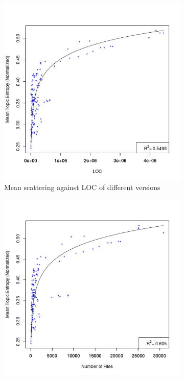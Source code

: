 \documentclass[12pt]{article}
\begin{document}

\begin{figure}
        \centering
        \begin{subfigure}[b]{0.5\textwidth}
                \centering
                \includegraphics[width=\textwidth]{mean-scattering-vs-loc-overall-fitted.jpg}
                \caption{Mean scattering against LOC of different versions}
                \label{overall-scatter1}
        \end{subfigure}%
        \begin{subfigure}[b]{0.5\textwidth}
                \centering
                \includegraphics[width=\textwidth]{mean-scattering-vs-num-files-overall-fitted.jpg}

\end{subfigure}
\end{figure}
\end{document}
